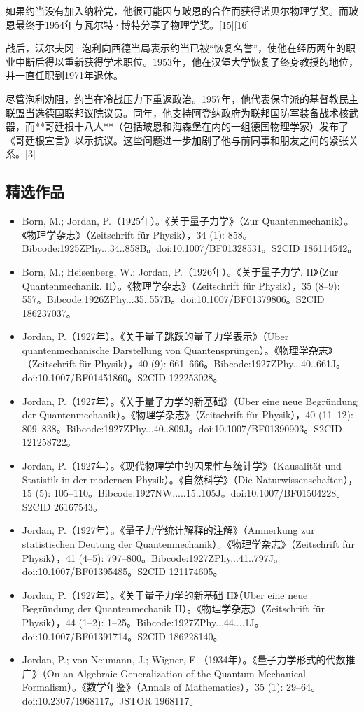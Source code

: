 如果约当没有加入纳粹党，他很可能因与玻恩的合作而获得诺贝尔物理学奖。而玻恩最终于1954年与瓦尔特·博特分享了物理学奖。[15][16]

战后，沃尔夫冈·泡利向西德当局表示约当已被“恢复名誉”，使他在经历两年的职业中断后得以重新获得学术职位。1953年，他在汉堡大学恢复了终身教授的地位，并一直任职到1971年退休。

尽管泡利劝阻，约当在冷战压力下重返政治。1957年，他代表保守派的基督教民主联盟当选德国联邦议院议员。同年，他支持阿登纳政府为联邦国防军装备战术核武器，而**哥廷根十八人**（包括玻恩和海森堡在内的一组德国物理学家）发布了《哥廷根宣言》以示抗议。这些问题进一步加剧了他与前同事和朋友之间的紧张关系。[3]
\subsection{精选作品}
\begin{itemize}
\item Born, M.; Jordan, P.（1925年）。《关于量子力学》（Zur Quantenmechanik）。《物理学杂志》（Zeitschrift für Physik），34 (1): 858。Bibcode:1925ZPhy...34..858B。doi:10.1007/BF01328531。S2CID 186114542。
\item Born, M.; Heisenberg, W.; Jordan, P.（1926年）。《关于量子力学. II》（Zur Quantenmechanik. II）。《物理学杂志》（Zeitschrift für Physik），35 (8–9): 557。Bibcode:1926ZPhy...35..557B。doi:10.1007/BF01379806。S2CID 186237037。
\item Jordan, P.（1927年）。《关于量子跳跃的量子力学表示》（Über quantenmechanische Darstellung von Quantensprüngen）。《物理学杂志》（Zeitschrift für Physik），40 (9): 661–666。Bibcode:1927ZPhy...40..661J。doi:10.1007/BF01451860。S2CID 122253028。
\item Jordan, P.（1927年）。《关于量子力学的新基础》（Über eine neue Begründung der Quantenmechanik）。《物理学杂志》（Zeitschrift für Physik），40 (11–12): 809–838。Bibcode:1927ZPhy...40..809J。doi:10.1007/BF01390903。S2CID 121258722。
\item Jordan, P.（1927年）。《现代物理学中的因果性与统计学》（Kausalität und Statistik in der modernen Physik）。《自然科学》（Die Naturwissenschaften），15 (5): 105–110。Bibcode:1927NW.....15..105J。doi:10.1007/BF01504228。S2CID 26167543。
\item Jordan, P.（1927年）。《量子力学统计解释的注解》（Anmerkung zur statistischen Deutung der Quantenmechanik）。《物理学杂志》（Zeitschrift für Physik），41 (4–5): 797–800。Bibcode:1927ZPhy...41..797J。doi:10.1007/BF01395485。S2CID 121174605。
\item Jordan, P.（1927年）。《关于量子力学的新基础 II》（Über eine neue Begründung der Quantenmechanik II）。《物理学杂志》（Zeitschrift für Physik），44 (1–2): 1–25。Bibcode:1927ZPhy...44....1J。doi:10.1007/BF01391714。S2CID 186228140。
\item Jordan, P.; von Neumann, J.; Wigner, E.（1934年）。《量子力学形式的代数推广》（On an Algebraic Generalization of the Quantum Mechanical Formalism）。《数学年鉴》（Annals of Mathematics），35 (1): 29–64。doi:10.2307/1968117。JSTOR 1968117。
\end{itemize}
